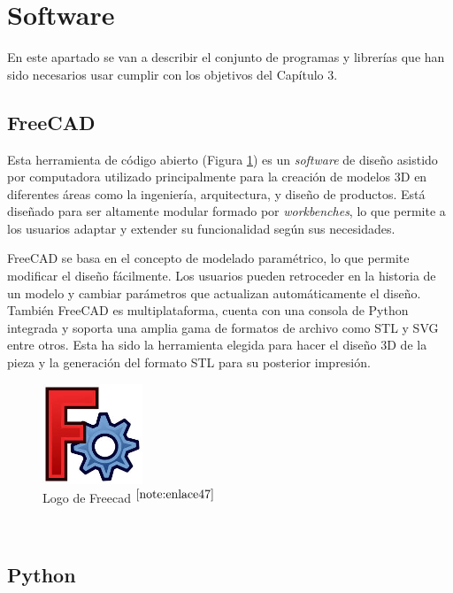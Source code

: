 \section{Software}

En este apartado se van a describir el conjunto de programas y librerías que han sido necesarios usar cumplir con los objetivos del Capítulo 3.

\subsection{FreeCAD}

Esta herramienta de código abierto (Figura \ref{fig:freecad}) es un \textit{software} de diseño asistido por computadora utilizado principalmente para la creación de modelos 3D en diferentes áreas como la ingeniería, arquitectura, y diseño de productos. Está diseñado para ser altamente modular formado por \textit{workbenches}, lo que permite a los usuarios adaptar y extender su funcionalidad según sus necesidades.

FreeCAD se basa en el concepto de modelado paramétrico, lo que permite modificar el diseño fácilmente. Los usuarios pueden retroceder en la historia de un modelo y cambiar parámetros que actualizan automáticamente el diseño. También FreeCAD es multiplataforma, cuenta con una consola de Python integrada y soporta una amplia gama de formatos de archivo como STL y SVG entre otros. Esta ha sido la herramienta elegida para hacer el diseño 3D de la pieza y la generación del formato STL para su posterior impresión. 

\begin{figure} [h!]
	\begin{center}
		\includegraphics[width=3cm]{figs/freecad.png}
	\end{center}
	\caption{Logo de Freecad $^{\ref{note:enlace47}}$} 
	\label{fig:freecad}
\end{figure}\

\setcounter{footnote}{47} %

\subsection{Python}


